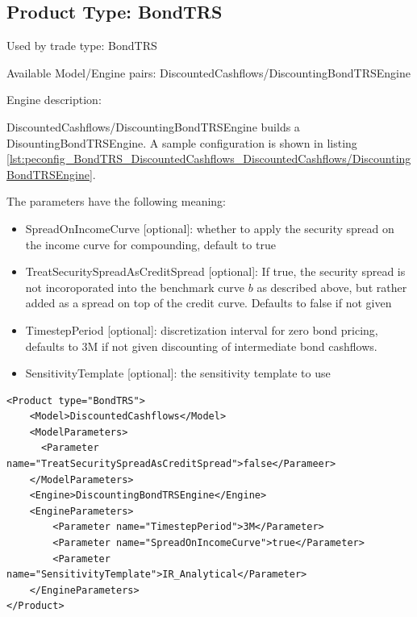 \subsection{Product Type: BondTRS}

Used by trade type: BondTRS

Available Model/Engine pairs: DiscountedCashflows/DiscountingBondTRSEngine

Engine description:

DiscountedCashflows/DiscountingBondTRSEngine builds a DisountingBondTRSEngine. A sample configuration is shown in listing \ref{lst:peconfig_BondTRS_DiscountedCashflows_DiscountedCashflows/DiscountingBondTRSEngine}.

The parameters have the following meaning:

\begin{itemize}
\item SpreadOnIncomeCurve [optional]: whether to apply the security spread on the income curve for compounding, default to true
\item TreatSecuritySpreadAsCreditSpread [optional]: If true, the security spread is not incoroporated into the benchmark curve $b$
  as described above, but rather added as a spread on top of the credit curve. Defaults to false if not given
\item TimestepPeriod [optional]: discretization interval for zero bond pricing, defaults to 3M if not given
  discounting of intermediate bond cashflows.
\item SensitivityTemplate [optional]: the sensitivity template to use
\end{itemize}

\begin{longlisting}
\begin{verbatim}
<Product type="BondTRS">
    <Model>DiscountedCashflows</Model>
    <ModelParameters>
      <Parameter name="TreatSecuritySpreadAsCreditSpread">false</Parameer>
    </ModelParameters>
    <Engine>DiscountingBondTRSEngine</Engine>
    <EngineParameters>
        <Parameter name="TimestepPeriod">3M</Parameter>
        <Parameter name="SpreadOnIncomeCurve">true</Parameter>
        <Parameter name="SensitivityTemplate">IR_Analytical</Parameter>
    </EngineParameters>
</Product>
\end{verbatim}
\caption{Configuration for Product BondTRS , Model DiscountedCashflows, Engine DiscountingBondTRSEngine}
\label{lst:peconfig_BondTRS_DiscountedCashflows_DiscountedCashflows/DiscountingBondTRSEngine}
\end{longlisting}


